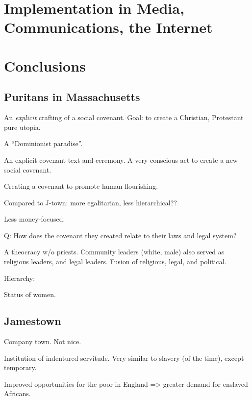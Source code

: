 \documentclass[
]{book}
\begin{document}
\hypertarget{implementation-in-media-communications-the-internet}{%
\chapter{Implementation in Media, Communications, the Internet}\label{implementation-in-media-communications-the-internet}}

\hypertarget{conclusions}{%
\chapter{Conclusions}\label{conclusions}}

\hypertarget{puritans-in-massachusetts}{%
\section{Puritans in Massachusetts}\label{puritans-in-massachusetts}}

An \emph{explicit} crafting of a social covenant. Goal: to create a Christian, Protestant pure utopia.

A ``Dominionist paradise''.

An explicit covenant text and ceremony. A very conscious act to create a new social covenant.

Creating a covenant to promote human flourishing.

Compared to J-town: more egalitarian, less hierarchical??

Less money-focused.

Q: How does the covenant they created relate to their laws and legal system?

A theocracy w/o priests. Community leaders (white, male) also served as religious leaders, and legal leaders. Fusion of religious, legal, and political.

Hierarchy:

Status of women.

\hypertarget{jamestown}{%
\section{Jamestown}\label{jamestown}}

Company town. Not nice.

Institution of indentured servitude. Very similar to slavery (of the time), except temporary.

Improved opportunities for the poor in England =\textgreater{} greater demand for enslaved Africans.
\end{document}
